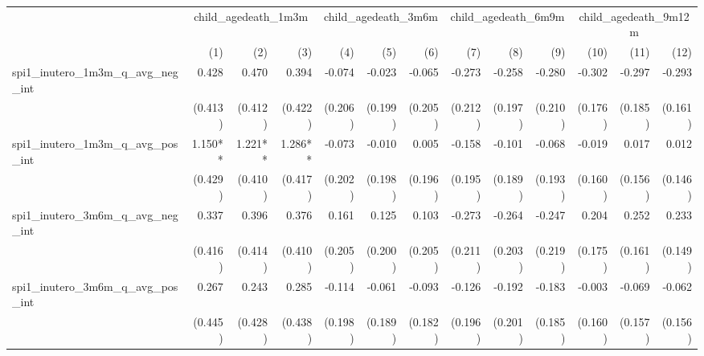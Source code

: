 \begin{tabular}{lrrrrrrrrrrrr}
\toprule
                                            &  \multicolumn{3}{c}{child\_agedeath\_1m3m} &  \multicolumn{3}{c}{child\_agedeath\_3m6m} &  \multicolumn{3}{c}{child\_agedeath\_6m9m} & \multicolumn{3}{c}{child\_agedeath\_9m12m} \\ 
\cmidrule(lr){2-4} \cmidrule(lr){5-7} \cmidrule(lr){8-10} \cmidrule(lr){11-13} 
                                            &          (1) &          (2) &          (3) &          (4) &          (5) &          (6) &          (7) &          (8) &          (9) &         (10) &         (11) &         (12) \\ 
\midrule
spi1\_inutero\_1m3m\_q\_avg\_neg\_int       &        0.428 &        0.470 &        0.394 &       -0.074 &       -0.023 &       -0.065 &       -0.273 &       -0.258 &       -0.280 &       -0.302 &       -0.297 &       -0.293 \\ 
                                            &      (0.413) &      (0.412) &      (0.422) &      (0.206) &      (0.199) &      (0.205) &      (0.212) &      (0.197) &      (0.210) &      (0.176) &      (0.185) &      (0.161) \\ 
spi1\_inutero\_1m3m\_q\_avg\_pos\_int       &      1.150** &      1.221** &      1.286** &       -0.073 &       -0.010 &        0.005 &       -0.158 &       -0.101 &       -0.068 &       -0.019 &        0.017 &        0.012 \\ 
                                            &      (0.429) &      (0.410) &      (0.417) &      (0.202) &      (0.198) &      (0.196) &      (0.195) &      (0.189) &      (0.193) &      (0.160) &      (0.156) &      (0.146) \\ 
spi1\_inutero\_3m6m\_q\_avg\_neg\_int       &        0.337 &        0.396 &        0.376 &        0.161 &        0.125 &        0.103 &       -0.273 &       -0.264 &       -0.247 &        0.204 &        0.252 &        0.233 \\ 
                                            &      (0.416) &      (0.414) &      (0.410) &      (0.205) &      (0.200) &      (0.205) &      (0.211) &      (0.203) &      (0.219) &      (0.175) &      (0.161) &      (0.149) \\ 
spi1\_inutero\_3m6m\_q\_avg\_pos\_int       &        0.267 &        0.243 &        0.285 &       -0.114 &       -0.061 &       -0.093 &       -0.126 &       -0.192 &       -0.183 &       -0.003 &       -0.069 &       -0.062 \\ 
                                            &      (0.445) &      (0.428) &      (0.438) &      (0.198) &      (0.189) &      (0.182) &      (0.196) &      (0.201) &      (0.185) &      (0.160) &      (0.157) &      (0.156) \\ 

\end{tabular}

